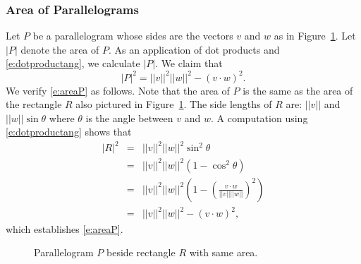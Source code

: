 \documentclass{ximera}
\begin{document}
\subsubsection{Area of Parallelograms}

Let $P$ be a parallelogram whose sides are the vectors $v$ and $w$ as
in Figure~\ref{F:parallel}.  Let $|P|$ denote the area of $P$.  As an
application of dot products  and
\eqref{e:dotproductang}, we calculate $|P|$. 
We claim that
\begin{equation}  \label{e:areaP}
|P|^2 = ||v||^2||w||^2 - (v\cdot w)^2.
\end{equation}
We verify \eqref{e:areaP} as follows.  Note that the area of $P$
is the same as the area of the rectangle $R$ also pictured in
Figure~\ref{F:parallel}.  The side lengths of $R$ are: $||v||$ and
$||w||\sin\theta$ where $\theta$ is the angle between $v$ and $w$.
A computation using \eqref{e:dotproductang} shows that
\begin{eqnarray*}
|R|^2 & = & ||v||^2 ||w||^2\sin^2\theta \\
& = & ||v||^2 ||w||^2(1-\cos^2\theta) \\
& = & ||v||^2 ||w||^2\left(1-\left(\frac{v\cdot w}{||v|| ||w||}
\right)^2\right)\\
& = & ||v||^2 ||w||^2 - (v\cdot w)^2,
\end{eqnarray*}
which establishes \eqref{e:areaP}.

\begin{figure}[htb]
     \centerline{%
     }
     \caption{Parallelogram $P$ beside rectangle $R$ with same area.}
     \label{F:parallel}
\end{figure}




\end{document}
